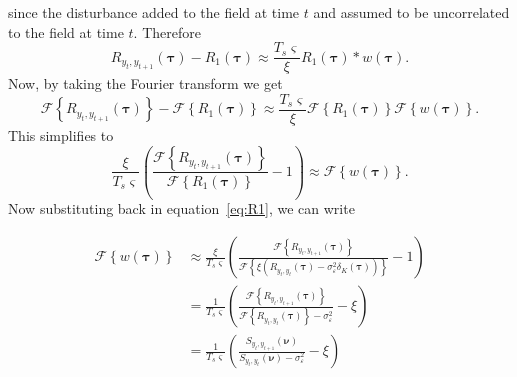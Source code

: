 \documentclass[]{article}
\begin{document}
since the disturbance added to the field at time $t$ and assumed to be uncorrelated to the field at time $t$. Therefore 
\begin{equation}
	R_{y_{t},y_{t+1}}(\boldsymbol{\tau}) - R_1(\boldsymbol{\tau}) \approx \frac{T_s \varsigma}{\xi} R_1(\boldsymbol{\tau}) \ast w\left(\boldsymbol{\tau}\right).
\end{equation}
Now, by taking the Fourier transform we get
\begin{equation}
	\mathcal{F}\left\{R_{y_{t},y_{t+1}}(\boldsymbol{\tau})\right\} - \mathcal{F}\left\{R_1(\boldsymbol{\tau})\right\} \approx \frac{T_s \varsigma}{\xi} \mathcal{F}\left\{R_1(\boldsymbol{\tau})\right\} \mathcal{F}\left\{ w\left(\boldsymbol{\tau}\right)\right\}.
\end{equation}
This simplifies to
\begin{equation}
	\frac{\xi}{T_s \varsigma} \left(\frac{\mathcal{F}\left\{R_{y_{t},y_{t+1}}(\boldsymbol{\tau})\right\}}{\mathcal{F}\left\{R_1(\boldsymbol{\tau})\right\}} - 1\right) \approx  \mathcal{F}\left\{ w\left(\boldsymbol{\tau}\right)\right\}.
\end{equation}
Now substituting back in equation~\ref{eq:R1}, we can write

\begin{align}
	\mathcal{F}\left\{ w\left(\boldsymbol{\tau}\right)\right\} &\approx \frac{\xi}{T_s \varsigma} \left(\frac{\mathcal{F}\left\{R_{y_{t},y_{t+1}}(\boldsymbol{\tau})\right\}}{\mathcal{F}\left\{\xi\left( R_{y_{t},y_{t}}(\boldsymbol{\tau}) - \sigma_{\varepsilon}^2\delta_K\left(\boldsymbol{\tau}\right) \right)\right\}} - 1\right)  \\
	&= \frac{1}{T_s \varsigma} \left(\frac{\mathcal{F}\left\{R_{y_{t},y_{t+1}}(\boldsymbol{\tau})\right\}}{\mathcal{F}\left\{ R_{y_{t},y_{t}}(\boldsymbol{\tau})\right\} - \sigma_{\varepsilon}^2 } - \xi\right) \\
	&= \frac{1}{T_s \varsigma} \left(\frac{S_{y_{t},y_{t+1}}\left(\boldsymbol{\nu}\right)}{S_{y_{t},y_{t}}\left(\boldsymbol{\nu}\right) - \sigma_{\varepsilon}^2 } - \xi\right)
\end{align}
\end{document}
